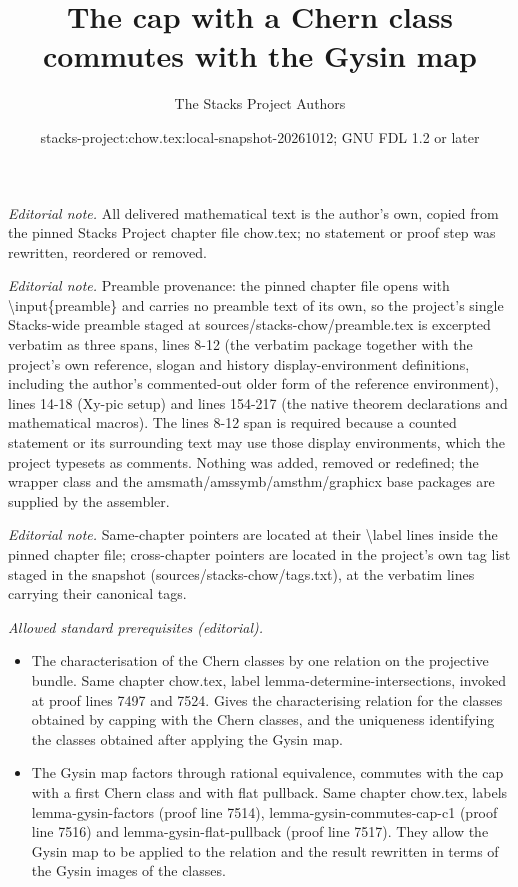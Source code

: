 \documentclass[10pt,a4paper]{amsart}
\title{The cap with a Chern class commutes with the Gysin map}
\author{The Stacks Project Authors}
\date{stacks-project:chow.tex:local-snapshot-20261012; GNU FDL 1.2 or later}
\theoremstyle{plain}
\theoremstyle{definition}
\theoremstyle{remark}
\numberwithin{equation}{subsection}
\begin{document}
\maketitle
\noindent\textit{Editorial note.} All delivered mathematical text is the author's own, copied from the pinned Stacks Project chapter file chow.tex; no statement or proof step was rewritten, reordered or removed.\par\medskip
\noindent\textit{Editorial note.} Preamble provenance: the pinned chapter file opens with \textbackslash{}input\{preamble\} and carries no preamble text of its own, so the project's single Stacks-wide preamble staged at sources/stacks-chow/preamble.tex is excerpted verbatim as three spans, lines 8-12 (the verbatim package together with the project's own reference, slogan and history display-environment definitions, including the author's commented-out older form of the reference environment), lines 14-18 (Xy-pic setup) and lines 154-217 (the native theorem declarations and mathematical macros). The lines 8-12 span is required because a counted statement or its surrounding text may use those display environments, which the project typesets as comments. Nothing was added, removed or redefined; the wrapper class and the amsmath/amssymb/amsthm/graphicx base packages are supplied by the assembler.\par\medskip
\noindent\textit{Editorial note.} Same-chapter pointers are located at their \textbackslash{}label lines inside the pinned chapter file; cross-chapter pointers are located in the project's own tag list staged in the snapshot (sources/stacks-chow/tags.txt), at the verbatim lines carrying their canonical tags.\par\medskip
\noindent\textit{Allowed standard prerequisites (editorial).}\begin{itemize}
\item The characterisation of the Chern classes by one relation on the projective bundle. Same chapter chow.tex, label lemma-determine-intersections, invoked at proof lines 7497 and 7524. Gives the characterising relation for the classes obtained by capping with the Chern classes, and the uniqueness identifying the classes obtained after applying the Gysin map.
\item The Gysin map factors through rational equivalence, commutes with the cap with a first Chern class and with flat pullback. Same chapter chow.tex, labels lemma-gysin-factors (proof line 7514), lemma-gysin-commutes-cap-c1 (proof line 7516) and lemma-gysin-flat-pullback (proof line 7517). They allow the Gysin map to be applied to the relation and the result rewritten in terms of the Gysin images of the classes.
\end{itemize}\medskip
\end{document}

